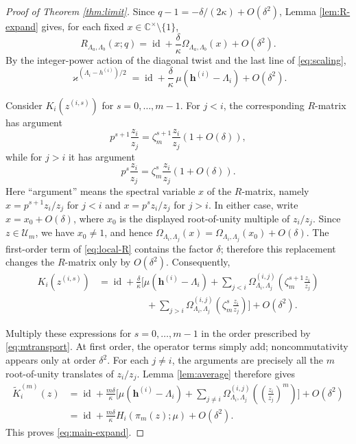 \documentclass[12pt]{amsart}
\theoremstyle{definition}
\numberwithin{equation}{section}
\theoremstyle{definition}
\let\mc\mathcal
\let\ka\kappa
\let\La\Lambda
\let\Om\Omega
\let\on\operatorname
\def\C{{\mathbb C}}
\def\id{\on{id}}
\def\beq{\begin{equation}}
\def\eeq{\end{equation}}
\begin{document}
\begin{proof}[Proof of Theorem \ref{thm:limit}]
Since $q-1=-\delta/(2\ka)+O(\delta^2)$, Lemma
\ref{lem:R-expand} gives, for each fixed
$x\in\C^\times\setminus\{1\}$,
\beq\label{eq:local-R}
 R_{\La_a,\La_b}(x;q)
 =\id+\frac\delta\ka\Om_{\La_a,\La_b}(x)+O(\delta^2).
\eeq
By the integer-power action of the diagonal twist and the
last line of \eqref{eq:scaling},
\beq\label{eq:twist-expand}
 \varkappa^{(\La_i-h^{(i)})/2}
 =\id+\frac\delta\ka\,\mu(\mathbf h^{(i)}-\La_i)
 +O(\delta^2).
\eeq

Consider $K_i(z^{(i,s)})$ for $s=0,\ldots,m-1$.
For $j<i$, the corresponding $R$-matrix has argument
\[
 p^{s+1}\frac{z_i}{z_j}
 =\zeta_m^{s+1}\frac{z_i}{z_j}(1+O(\delta)),
\]
while for $j>i$ it has argument
\[
 p^s\frac{z_i}{z_j}
 =\zeta_m^s\frac{z_i}{z_j}(1+O(\delta)).
\]
Here ``argument'' means the spectral variable $x$ of the
$R$-matrix, namely $x=p^{s+1}z_i/z_j$ for $j<i$ and
$x=p^s z_i/z_j$ for $j>i$.  In either case, write
$x=x_0+O(\delta)$, where $x_0$ is the displayed
root-of-unity multiple of $z_i/z_j$.  Since
$z\in\mc U_m$, we have $x_0\ne1$, and hence
$\Om_{\La_i,\La_j}(x)=\Om_{\La_i,\La_j}(x_0)+O(\delta)$.
The first-order term of \eqref{eq:local-R} contains the
factor $\delta$; therefore this replacement changes the
$R$-matrix only by $O(\delta^2)$.  Consequently,
\begin{align}
 K_i(z^{(i,s)})
 &=\id+\frac\delta\ka\Biggl[
 \mu(\mathbf h^{(i)}-\La_i)
 +\sum_{j<i}\Om_{\La_i,\La_j}^{(i,j)}
       \left(\zeta_m^{s+1}\frac{z_i}{z_j}\right)\nonumber\\
 &\hspace{60pt}+
 \sum_{j>i}\Om_{\La_i,\La_j}^{(i,j)}
       \left(\zeta_m^s\frac{z_i}{z_j}\right)
 \Biggr]+O(\delta^2).
 \label{eq:one-step-expansion}
\end{align}

Multiply these expressions for $s=0,\ldots,m-1$ in the
order prescribed by \eqref{eq:mtransport}.  At first order,
the operator terms simply add; noncommutativity appears
only at order $\delta^2$.  For each $j\ne i$, the arguments
are precisely all the $m$ root-of-unity translates of $z_i/z_j$.
Lemma \ref{lem:average} therefore gives
\begin{align*}
 \widetilde K_i^{(m)}(z)
 &=\id+\frac{m\delta}\ka\Biggl[
 \mu(\mathbf h^{(i)}-\La_i)
 +\sum_{j\ne i}\Om_{\La_i,\La_j}^{(i,j)}
       \left(\left(\frac{z_i}{z_j}\right)^m\right)
 \Biggr]+O(\delta^2)\\
 &=\id+\frac{m\delta}\ka H_i(\pi_m(z);\mu)+O(\delta^2).
\end{align*}
This proves \eqref{eq:main-expand}.


\end{proof}
\end{document}
